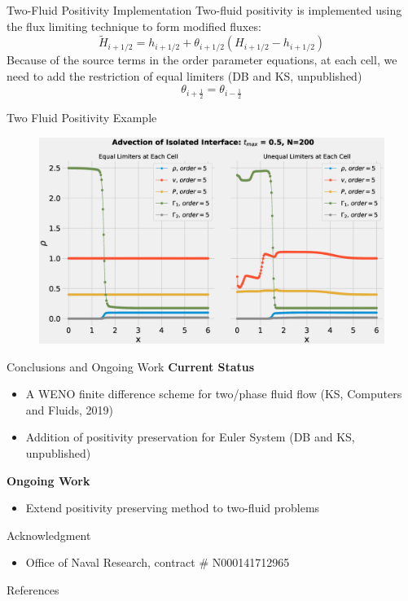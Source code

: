 \documentclass[10pt]{beamer}
\begin{document}
\begin{frame}{Two-Fluid Positivity Implementation}
Two-fluid positivity is implemented using the flux limiting technique to form modified fluxes:
$$\tilde{H}_{i+1/2}=h_{i+1/2} + \theta_{i+1/2}(H_{i+1/2} - h_{i+1/2})$$
Because of the source terms in the order parameter equations, at each cell, we need to add the restriction of equal limiters (DB and KS, unpublished)
$$
\theta_{i+\frac{1}{2}} = \theta_{i-\frac{1}{2}} 
$$

\end{frame}

\begin{frame}{Two Fluid Positivity Example}
  \begin{figure}[H]
    \centering
    \includegraphics[scale=0.275]{TwoFluidComparison.eps}
    \end{figure}
\end{frame}


\begin{frame}{Conclusions and Ongoing Work}
  \textbf{Current Status}
\begin{itemize}
  \item A WENO finite difference scheme for two/phase fluid flow (KS, Computers and Fluids, 2019)
  \item Addition of positivity preservation for Euler System (DB and KS, unpublished)
\end{itemize}
\textbf{Ongoing Work}
\begin{itemize}
  \item Extend positivity preserving method to two-fluid problems 
\end{itemize}
\end{frame}

\begin{frame}{Acknowledgment}
  \begin{itemize}
  \item
    Office of Naval Research, contract $\#$ N000141712965
  \end{itemize}  
  
\end{frame}  

\appendix

\begin{frame}[allowframebreaks]{References}

  
  

\end{frame}
\end{document}

